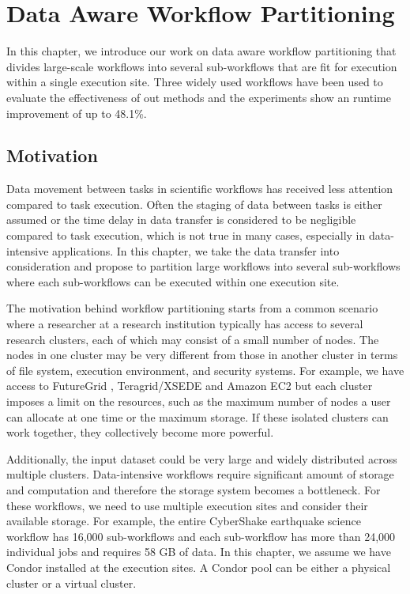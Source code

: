 \chapter{Data Aware Workflow Partitioning}
\label{chap:partitioning}

In this chapter, we introduce our work on data aware workflow partitioning that divides large-scale workflows into several sub-workflows that are fit for execution within a single execution site. Three widely used workflows have been used to evaluate the effectiveness of out methods and the experiments show an runtime improvement of up to 48.1\%. 


\section{Motivation}

Data movement between tasks in scientific workflows has received less attention compared to task execution. Often the staging of data between tasks is either assumed or the time delay in data transfer is considered to be negligible compared to task execution, which is not true in many cases, especially in data-intensive applications. In this chapter, we take the data transfer into consideration and propose to partition large workflows into several sub-workflows where each sub-workflows can be executed within one execution site. 

The motivation behind workflow partitioning starts from a common scenario where a researcher at a research institution typically has access to several research clusters, each of which may consist of a small number of nodes. The nodes in one cluster may be very different from those in another cluster in terms of file system, execution environment, and security systems. For example, we have access to FutureGrid \cite{Fox2013FutureGrid}, Teragrid/XSEDE \cite{TeraGrid}  and Amazon EC2 \cite{AmazonAWS} but each cluster imposes a limit on the resources, such as the maximum number of nodes a user can allocate at one time or the maximum storage. If these isolated clusters can work together, they collectively become more powerful.

Additionally, the input dataset could be very large and widely distributed across multiple clusters. Data-intensive workflows require significant amount of storage and computation and therefore the storage system becomes a bottleneck. For these workflows, we need to use multiple execution sites and consider their available storage. For example, the entire CyberShake earthquake science workflow has 16,000 sub-workflows and each sub-workflow has more than 24,000 individual jobs and requires 58 GB of data. In this chapter, we assume we have Condor installed at the execution sites. A Condor pool \cite{Kalayci2010} can be either a physical cluster or a virtual cluster. 

